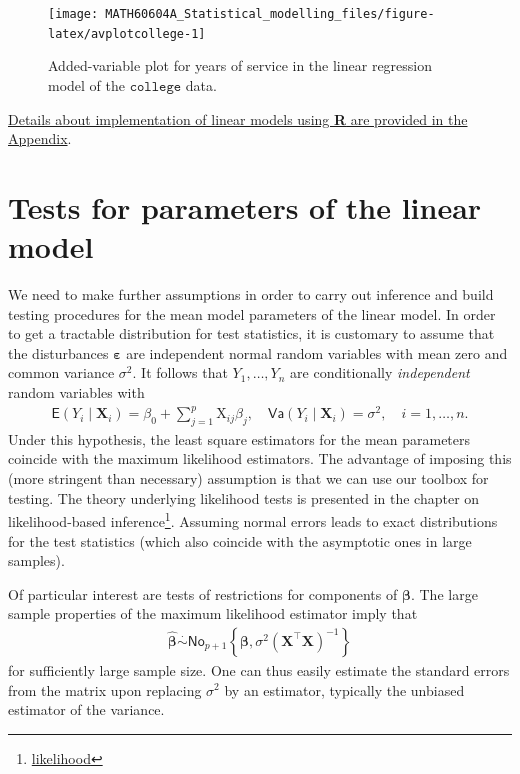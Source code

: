 \documentclass[
  11pt,
  letterpaper,
]{book}
\renewcommand{\href}[2]{#2\footnote{\url{#1}}}
\theoremstyle{definition}
\theoremstyle{definition}
\theoremstyle{definition}
\theoremstyle{remark}
\begin{document}
\begin{figure}

{\centering \texttt{[image: MATH60604A\_Statistical\_modelling\_files/figure-latex/avplotcollege-1]} 

}

\caption{Added-variable plot for years of service in the linear regression model of the  $\texttt{college}$ data.}\label{fig:avplotcollege}
\end{figure}

\protect\hyperlink{rlmfunc}{Details about implementation of linear models using \textbf{R} are provided in the Appendix}.

\hypertarget{test-lm}{%
\section{Tests for parameters of the linear model}\label{test-lm}}

We need to make further assumptions in order to carry out inference and build testing procedures for the mean model parameters of the linear model. In order to get a tractable distribution for test statistics, it is customary to assume that the disturbances \(\boldsymbol{\varepsilon}\) are independent normal random variables with mean zero and common variance \(\sigma^2\). It follows that \(Y_1, \ldots, Y_n\) are conditionally \emph{independent} random variables with
\begin{align*}
\mathsf{E}(Y_i \mid \mathbf{X}_i)=\beta_0 + \sum_{j=1}^p \mathrm{X}_{ij}\beta_j, \quad  \mathsf{Va}(Y_i\mid \mathbf{X}_i)= \sigma^2, \quad i=1, \ldots, n.    
\end{align*}
Under this hypothesis, the least square estimators for the mean parameters coincide with the maximum likelihood estimators. The advantage of imposing this (more stringent than necessary) assumption is that we can use our toolbox for testing. The theory underlying likelihood tests is presented in the chapter on \href{likelihood}{likelihood-based inference}. Assuming normal errors leads to exact distributions for the test statistics (which also coincide with the asymptotic ones in large samples).

Of particular interest are tests of restrictions for components of \(\boldsymbol{\beta}\). The large sample properties of the maximum likelihood estimator imply that
\begin{align*}
\widehat{\boldsymbol{\beta}} \stackrel{\cdot}{\sim}\mathsf{No}_{p+1}\left\{\boldsymbol{\beta}, \sigma^2(\mathbf{X}^\top\mathbf{X})^{-1}\right\}
\end{align*}
for sufficiently large sample size. One can thus easily estimate the standard errors from the matrix upon replacing \(\sigma^2\) by an estimator, typically the unbiased estimator of the variance.
\end{document}

